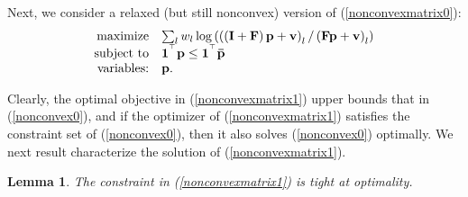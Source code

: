 \documentclass[10pt,twocolumn]{IEEEtran}
\newcommand{\0}{\mathbf{0}}
\newcommand{\1}{\mathbf{1}}
\newcommand{\trans}{^\top}
\newtheorem{lemma}{Lemma}
\newtheorem{example}{Example}
\begin{document}
Next, we consider a relaxed (but still nonconvex) version of (\ref{nonconvexmatrix0}):
\begin{equation}
\label{nonconvexmatrix1}
\begin{array}
[c]{rl}
\mbox{maximize} & \sum_l w_l \log\left(\left(\left(\mathbf{I}+\mathbf{F}\right)\mathbf{p}+\mathbf{v}\right)_l/\left(\mathbf{F}\mathbf{p}+\mathbf{v}\right)_l\right)\\
\mbox{subject to} & \mathbf{1}^{\trans} \mathbf{p} \le \mathbf{1}^{\trans} \mathbf{\bar{p}} \\
\mbox{variables:} & \mathbf{p}.
\end{array}
\end{equation}

Clearly, the optimal objective in (\ref{nonconvexmatrix1}) upper bounds that in (\ref{nonconvex0}), and if the optimizer of (\ref{nonconvexmatrix1}) satisfies the constraint set of (\ref{nonconvex0}), then it also solves (\ref{nonconvex0}) optimally. We next result characterize the solution of (\ref{nonconvexmatrix1}).
\begin{lemma}
\label{relaxtight}
The constraint in (\ref{nonconvexmatrix1}) is tight at optimality.
\end{lemma}


\end{document}
